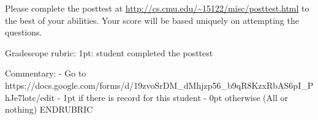 \clearpage
{}

Please complete the posttest at
\url{http://cs.cmu.edu/~15122/misc/posttest.html} to the best of your
abilities.  Your score will be based uniquely on attempting the
questions.

\RUBRIC

Gradescope rubric:
1pt: student completed the posttest

Commentary:
- Go to https://docs.google.com/forms/d/19zvoSrDM_dMhjzp56_b9qR8KzxRbAS6pI_PhJe7lotc/edit
- 1pt if there is record for this student
- 0pt otherwise
(All or nothing)
ENDRUBRIC